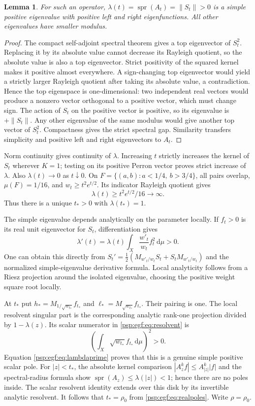 \documentclass[11pt,letterpaper]{article}
\numberwithin{equation}{section}
\newtheorem{lemma}[theorem]{Lemma}
\theoremstyle{remark}\newtheorem{remark}[theorem]{Remark}
\newcommand{\dd}{\,\mathrm d}
\newcommand{\spr}{\operatorname{spr}}
\begin{document}
\begin{lemma}\label{psp:egf:lem:perron}
For such an operator, $\lambda(t)=\spr(A_t)=\|S_t\|>0$ is a simple
positive eigenvalue with positive left and right eigenfunctions.
All other eigenvalues have smaller modulus.
\end{lemma}
\begin{proof}
The compact self-adjoint spectral theorem gives a top eigenvector of
$S_t^2$. Replacing it by its absolute value cannot decrease its Rayleigh
quotient, so the absolute value is also a top eigenvector. Strict
positivity of the squared kernel makes it positive almost everywhere.
A sign-changing top eigenvector would yield a strictly larger Rayleigh
quotient after taking its absolute value, a contradiction. Hence the top
eigenspace is one-dimensional: two independent real vectors would
produce a nonzero vector orthogonal to a positive vector, which must
change sign. The action of $S_t$ on the positive vector is positive,
so its eigenvalue is $+\|S_t\|$. Any other eigenvalue of the same modulus
would give another top vector of $S_t^2$. Compactness gives the strict
spectral gap. Similarity transfers simplicity and positive left and
right eigenvectors to $A_t$.
\end{proof}
Norm continuity gives continuity of $\lambda$. Increasing $t$ strictly
increases the kernel of $S_t$ wherever $K=1$; testing on its positive
Perron vector proves strict increase of $\lambda$. Also $\lambda(t)\to0$
as $t\downarrow0$. On
$F=\{(a,b):a<1/4,\ b>3/4\}$, all pairs overlap, $\mu(F)=1/16$, and
$w_t\geq t^2e^{t/2}$. Its indicator Rayleigh quotient gives
\[
 \lambda(t)\geq t^2e^{t/2}/16\longrightarrow\infty.
\]
Thus there is a unique $t_*>0$ with $\lambda(t_*)=1$.

The simple eigenvalue depends analytically on the parameter locally.
If $f_t>0$ is its real unit eigenvector for $S_t$, differentiation gives
\begin{equation}\label{psp:egf:eq:lambdaprime}
 \lambda'(t)=\lambda(t)\int_X\frac{w'_t}{w_t}f_t^2\dd\mu>0.
\end{equation}
One can obtain this directly from
$S_t'=\tfrac12(M_{w'_t/w_t}S_t+S_tM_{w'_t/w_t})$ and the normalized
simple-eigenvalue derivative formula. Local analyticity follows from a
Riesz projection around the isolated eigenvalue, choosing the positive
weight square root locally.

At $t_*$ put $h_*=M_{1/\sqrt{w_{t_*}}}f_{t_*}$ and
$\ell_*=M_{\sqrt{w_{t_*}}}f_{t_*}$. Their pairing is one. The local
resolvent singular part is the corresponding analytic rank-one
projection divided by $1-\lambda(z)$. Its scalar numerator in
\eqref{psp:egf:eq:resolvent} is
\[
 \left(\int_X\sqrt{w_{t_*}}f_{t_*}\dd\mu\right)^2>0.
\]
Equation \eqref{psp:egf:eq:lambdaprime} proves that this is a genuine simple
positive scalar pole. For $|z|<t_*$, the absolute kernel comparison
$|A_z^kf|\leq A_{|z|}^k|f|$ and the spectral-radius formula show
$\spr(A_z)\leq\lambda(|z|)<1$; hence there are no poles inside.
The scalar resolvent identity extends over this disk by its invertible
analytic resolvent. It follows that $t_*=\rho_0$ from
\eqref{psp:egf:eq:realpoles}. Write $\rho=\rho_0$.
\end{document}
